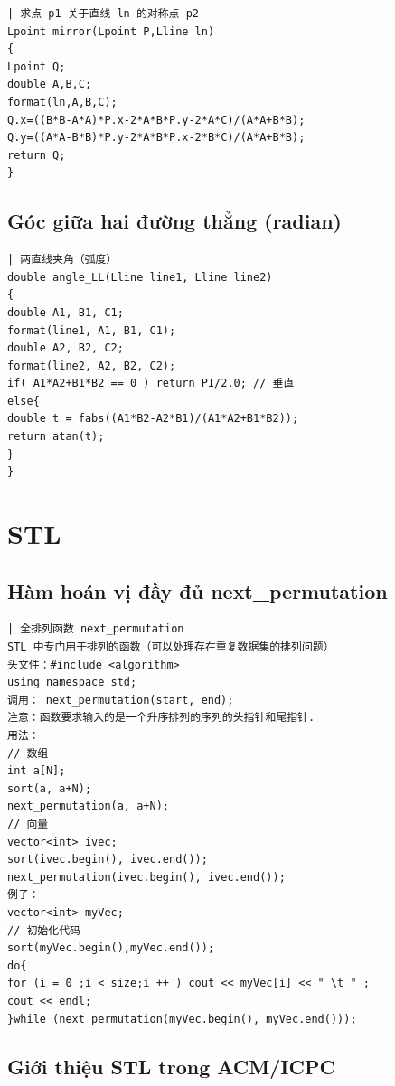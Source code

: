\documentclass[11pt]{article}
\begin{document}
\begingroup
\scriptsize
\begin{verbatim}
| 求点 p1 关于直线 ln 的对称点 p2
Lpoint mirror(Lpoint P,Lline ln)
{
Lpoint Q;
double A,B,C;
format(ln,A,B,C);
Q.x=((B*B-A*A)*P.x-2*A*B*P.y-2*A*C)/(A*A+B*B);
Q.y=((A*A-B*B)*P.y-2*A*B*P.x-2*B*C)/(A*A+B*B);
return Q;
}
\end{verbatim}
\endgroup

\subsection{Góc giữa hai đường thẳng (radian)}

\begingroup
\scriptsize
\begin{verbatim}
| 两直线夹角（弧度）
double angle_LL(Lline line1, Lline line2)
{
double A1, B1, C1;
format(line1, A1, B1, C1);
double A2, B2, C2;
format(line2, A2, B2, C2);
if( A1*A2+B1*B2 == 0 ) return PI/2.0; // 垂直
else{
double t = fabs((A1*B2-A2*B1)/(A1*A2+B1*B2));
return atan(t);
}
}
\end{verbatim}
\endgroup

\section{STL}

\subsection{Hàm hoán vị đầy đủ next\_permutation}

\begingroup
\scriptsize
\begin{verbatim}
| 全排列函数 next_permutation
STL 中专门用于排列的函数（可以处理存在重复数据集的排列问题）
头文件：#include <algorithm>
using namespace std;
调用： next_permutation(start, end);
注意：函数要求输入的是一个升序排列的序列的头指针和尾指针.
用法：
// 数组
int a[N];
sort(a, a+N);
next_permutation(a, a+N);
// 向量
vector<int> ivec;
sort(ivec.begin(), ivec.end());
next_permutation(ivec.begin(), ivec.end());
例子：
vector<int> myVec;
// 初始化代码
sort(myVec.begin(),myVec.end());
do{
for (i = 0 ;i < size;i ++ ) cout << myVec[i] << " \t " ;
cout << endl;
}while (next_permutation(myVec.begin(), myVec.end()));
\end{verbatim}
\endgroup

\subsection{Giới thiệu STL trong ACM/ICPC}
\end{document}
